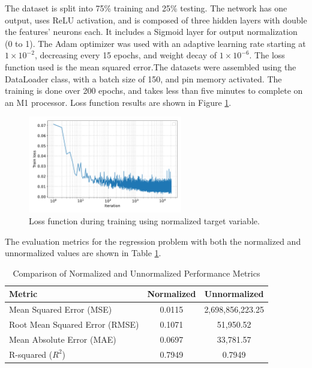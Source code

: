 \documentclass[unicode,11pt,a4paper,oneside,numbers=endperiod,openany]{scrartcl}
\begin{document}
The dataset is split into 75\% training and 25\% testing. The network has one output, uses ReLU activation, and is composed of three hidden layers with double the features' neurons each. It includes a Sigmoid layer for output normalization (0 to 1). The Adam optimizer was used with an adaptive learning rate starting  at $1\times10^{-2}$, decreasing every 15 epochs, and weight decay of $1\times10^{-6}$. The loss function used is the mean squared error.The datasets were assembled using the DataLoader class, with a batch
size of 150, and pin memory activated. The training is done over 200 epochs, and
takes less than five minutes to complete on an M1 processor. Loss function results are shown in Figure \ref{fig:task3_loss}.
\begin{figure}[h]
    \centering
    \includegraphics[width=0.6\textwidth]{../Proj1_Y24/Task3/loss.pdf}
    \caption{Loss function during training using normalized target variable.}
    \label{fig:task3_loss}
\end{figure}
The evaluation metrics for the regression problem with both the normalized and
unnormalized values are shown in Table \ref{tab:evaluation_metrics}. 
\begin{table}[htbp]
    \centering
    \begin{tabular}{lcc}
        \hline
        \textbf{Metric} & \textbf{Normalized} & \textbf{Unnormalized} \\
        \hline
        Mean Squared Error (MSE) & 0.0115 & 2,698,856,223.25 \\
        Root Mean Squared Error (RMSE) & 0.1071 & 51,950.52 \\
        Mean Absolute Error (MAE) & 0.0697 & 33,781.57 \\
        R-squared ($R^2$) & 0.7949 & 0.7949 \\
        \hline
    \end{tabular}
    \caption{Comparison of Normalized and Unnormalized Performance Metrics}
    \label{tab:evaluation_metrics}
\end{table}
\end{document}
